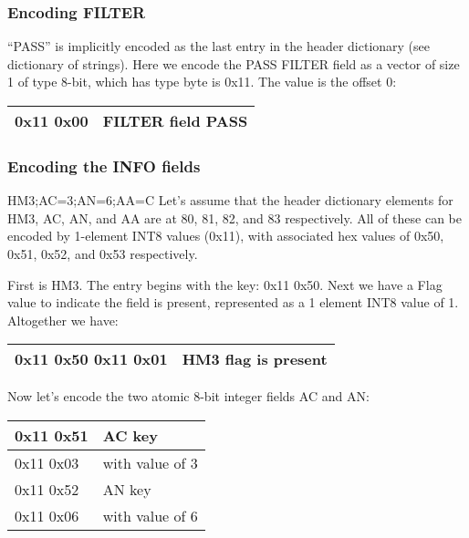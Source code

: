 \documentclass[8pt]{article}
\begin{document}
\subsubsection{Encoding FILTER}

``PASS'' is implicitly encoded as the last entry in the header dictionary (see dictionary of strings).  Here we encode the PASS FILTER field as a vector of size 1 of type 8-bit, which has type byte is 0x11.  The value is the offset 0:

\vspace{0.3cm}
\begin{tabular}{|l| l|} \hline
0x11 0x00 & FILTER field PASS \\ \hline
\end{tabular}

\subsubsection{Encoding the INFO fields}

HM3;AC=3;AN=6;AA=C
Let's assume that the header dictionary elements for HM3, AC, AN, and AA are at 80, 81, 82, and 83 respectively.  All of these can be encoded by 1-element INT8 values (0x11), with associated hex values of 0x50, 0x51, 0x52, and 0x53 respectively.

First is HM3.  The entry begins with the key: 0x11 0x50.  Next we have a Flag value to indicate the field is present, represented as a 1 element INT8 value of 1.  Altogether we have:

\vspace{0.3cm}
\begin{tabular}{|l| l|} \hline
0x11 0x50 0x11 0x01 & HM3 flag is present \\ \hline
\end{tabular}
\vspace{0.3cm}

Now let's encode the two atomic 8-bit integer fields AC and AN:

\vspace{0.3cm}
\begin{tabular}{|l| l|} \hline
0x11 0x51 & AC key \\ \hline
0x11 0x03 & with value of 3 \\ \hline
0x11 0x52 & AN key \\ \hline
0x11 0x06 & with value of 6 \\ \hline
\end{tabular}
\vspace{0.3cm}
\end{document}
